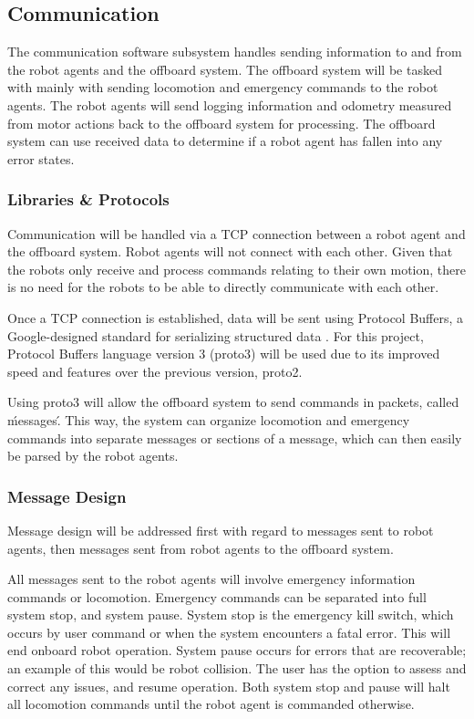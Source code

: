 
\subsection{Communication}
\label{sec:software_comm}

The communication software subsystem handles sending information to and from the robot agents and the offboard system. The offboard system will be tasked with mainly with sending locomotion and emergency commands to the robot agents. The robot agents will send logging information and odometry measured from motor actions back to the offboard system for processing. The offboard system can use received data to determine if a robot agent has fallen into any error states.

\subsubsection{Libraries \& Protocols}
\label{sec:software_comm_libs}
Communication will be handled via a TCP connection between a robot agent and the offboard system. Robot agents will not connect with each other. Given that the robots only receive and process commands relating to their own motion, there is no need for the robots to be able to directly communicate with each other. 

Once a TCP connection is established, data will be sent using Protocol Buffers, a Google-designed standard for serializing structured data \cite{protobuf3}. For this project, Protocol Buffers language version 3 (proto3) will be used due to its improved speed and features over the previous version, proto2. 

Using proto3 will allow the offboard system to send commands in packets, called \'messages\'. This way, the system can organize locomotion and emergency commands into separate messages or sections of a message, which can then easily be parsed by the robot agents. 

\subsubsection{Message Design}
\label{sec:software_comm_msg}
Message design will be addressed first with regard to messages sent to robot agents, then messages sent from robot agents to the offboard system.

All messages sent to the robot agents will involve emergency information commands or locomotion. Emergency commands can be separated into full system stop, and system pause. System stop is the emergency kill switch, which occurs by user command or when the system encounters a fatal error. This will end onboard robot operation. System pause occurs for errors that are recoverable; an example of this would be robot collision. The user has the option to assess and correct any issues, and resume operation. Both system stop and pause will halt all locomotion commands until the robot agent is commanded otherwise.

